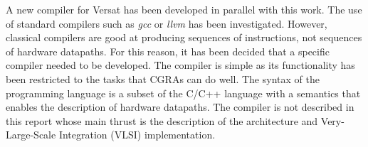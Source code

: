 A new compiler for Versat has been developed in parallel with this
work. The use of standard compilers such as {\it gcc} or {\it llvm}
has been investigated. However, classical compilers are good at
producing sequences of instructions, not sequences of hardware
datapaths. For this reason, it has been decided that a specific
compiler needed to be developed. The compiler is simple as its
functionality has been restricted to the tasks that CGRAs can do
well. The syntax of the programming language is a subset of the C/C++
language with a semantics that enables the description of hardware
datapaths. The compiler is not described in this report whose main
thrust is the description of the architecture and Very-Large-Scale
Integration (VLSI) implementation.


\begin{comment}

CGRAs have gained increasing attention in the last 2 decades both in
academia and industry
\cite{Mei05,Lee00,Weinhardt03,Quax04,deSousa12}. CGRAs are
programmable hardware mesh structures that operate on word-length
variables and are efficient in terms of operations per unit of silicon
area. CGRAs can be built with RISC processor arrays \cite{Waingold97}
or simpler components such as adders, subtractors, multipliers,
shifters, etc \cite{Tripp07,deSousa12}. We have identified the latter
CGRAs as the most suitable architecture for a vast range of low power
devices. A good survey of CGRAs is given in \cite{deSutter10}.

The main contribution in \cite{deSousa12} was the invention of an
address generation scheme able to support groups of nested loops in a
single machine configuration. The idea, aimed at reducing
reconfiguration time, was inspired by the use of cascaded counters for
address generation \cite{Carta06}. This represented a major
improvement from other works that focus exclusively in supporting the
inner loops of compute kernels \cite{deSutter10}.  However, as this
paper shows, more can be done to reduce the reconfiguration overhead.

A critical aspect for achieving performance speedups is dynamic
reconfiguration of the CGRA. Static reconfiguration where the array is
configured once to run a complete kernel is far less flexible
\cite{Hartenstein01}. Some arrays are dynamically reconfigurable but
they only iterate over a fixed sequence of configurations
\cite{Quax04,Mei05,Lee00}.

The question of heterogeneity versus homogeneity of the functional
units inside a CGRA is an important one. Some CGRAs are homogeneous
\cite{Ebeling96}, whereas others support a diversity of FUs
\cite{Heysters03}. A careful analysis in \cite{Park12} has favored
heterogeneous CGRAs as the performance degradation when going from
homogeneous to heterogeneous is greatly compensated by the silicon
utilization rate and power efficiency of heterogeneous
solutions. Thus, we adopt heterogeneous CGRAs in this project.
 

\end{comment}

